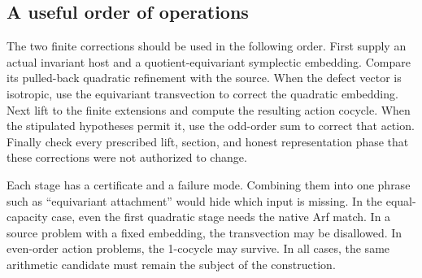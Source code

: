 \subsection{A useful order of operations}
The two finite corrections should be used in the following order. First supply an actual invariant host and a quotient-equivariant symplectic embedding. Compare its pulled-back quadratic refinement with the source. When the defect vector is isotropic, use the equivariant transvection to correct the quadratic embedding. Next lift to the finite extensions and compute the resulting action cocycle. When the stipulated hypotheses permit it, use the odd-order sum to correct that action. Finally check every prescribed lift, section, and honest representation phase that these corrections were not authorized to change.

Each stage has a certificate and a failure mode. Combining them into one phrase such as ``equivariant attachment'' would hide which input is missing. In the equal-capacity case, even the first quadratic stage needs the native Arf match. In a source problem with a fixed embedding, the transvection may be disallowed. In even-order action problems, the 1-cocycle may survive. In all cases, the same arithmetic candidate must remain the subject of the construction.

